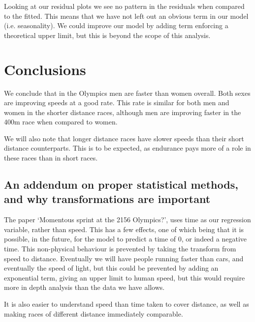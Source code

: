 \documentclass[11pt]{article}
\begin{document}
Looking at our residual plots we see no pattern in the residuals when compared to the fitted. This means that we have not left out an obvious term in our model (i.e. seasonality). We could improve our model by adding term enforcing a theoretical upper limit, but this is beyond the scope of this analysis.



\section{Conclusions}

We conclude that in the Olympics men are faster than women overall. Both sexes are improving speeds at a good rate. This rate is similar for both men and women in the shorter distance races, although men are improving faster in the 400m race when compared to women.

We will also note that longer distance races have slower speeds than their short distance counterparts. This is to be expected, as endurance pays more of a role in these races than in short races.

\subsection{An addendum on proper statistical methods, and why transformations are important}

The \citet{oly2156} paper `Momentous sprint at the 2156 Olympics?', uses time as our regression variable, rather than speed. This has a few effects, one of which being that it is possible, in the future, for the model to predict a time of 0, or indeed a negative time. This non-physical behaviour is prevented by taking the transform from speed to distance. Eventually we will have people running faster than cars, and eventually the speed of light, but this could be prevented by adding an exponential term, giving an upper limit to human speed, but this would require more in depth analysis than the data we have allows. 

It is also easier to understand speed than time taken to cover distance, as well as making races of different distance immediately comparable. 


\end{document}
